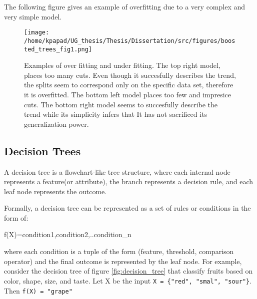\begin{enumerate}
The following figure gives an example of overfitting due to a very complex and very simple model.
\begin{figure}[h]
\centering
\texttt{[image: /home/kpapad/UG\_thesis/Thesis/Dissertation/src/figures/boosted\_trees\_fig1.png]}
\caption{Examples of over fitting and under fitting. The top right model, places too many cuts. Even though it succesfully describes the trend, the splits seem to correspond only on the specific data set, therefore it is overfitted. The bottom left model places too few and impresice cuts. The bottom right model seems to succesfully describe the trend while its simplicity infers that It has not sacrificed its generalization power. }
\label{fig:ovft}
\end{figure}
\end{enumerate}

\subsection{Decision Trees}
\label{sec:org266e57e}
A decision tree is a flowchart-like tree structure, where each internal node represents a feature(or attribute), the branch represents a decision rule, and each leaf node represents the outcome.

Formally, a decision tree can be represented as a set of rules or conditions in the form of:
\begin{center}
\begin{verbatim*}
f(X)={condition1,condition2,..condition_n}
\end{verbatim*}
\end{center}
where each condition is a tuple of the form (feature, threshold, comparison operator) and the final outcome is represented by the leaf node. For example, consider the decision tree of  figure \ref{fig:decision_tree} that classify fruits based on color, shape, size, and taste. Let X be the input \texttt{X = \{"red", "smal", "sour"\}}. Then \texttt{f(X) = "grape"}  \cite{PatternClassification}

